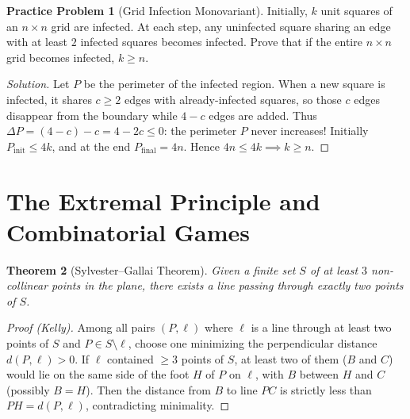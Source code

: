 \documentclass[11pt]{article}
\theoremstyle{plain}
\newtheorem{theorem}{Theorem}[section]
\theoremstyle{definition}
\newtheorem{problem}[theorem]{Practice Problem}
\newenvironment{solution}{\begin{proof}[Solution]}{\end{proof}}
\begin{document}
\begin{problem}[Grid Infection Monovariant]
Initially, $k$ unit squares of an $n \times n$ grid are infected. At each step, any uninfected square sharing an edge with at least $2$ infected squares becomes infected. Prove that if the entire $n \times n$ grid becomes infected, $k \ge n$.
\end{problem}
\begin{solution}
Let $P$ be the perimeter of the infected region. When a new square is infected, it shares $c \ge 2$ edges with already-infected squares, so those $c$ edges disappear from the boundary while $4-c$ edges are added. Thus $\Delta P = (4-c) - c = 4 - 2c \le 0$: the perimeter $P$ never increases! Initially $P_{\text{init}} \le 4k$, and at the end $P_{\text{final}} = 4n$. Hence $4n \le 4k \implies k \ge n$.
\end{solution}

\section{The Extremal Principle and Combinatorial Games}

\begin{theorem}[Sylvester--Gallai Theorem]
Given a finite set $S$ of at least $3$ non-collinear points in the plane, there exists a line passing through \emph{exactly two} points of $S$.
\end{theorem}
\begin{proof}[Proof (Kelly)]
Among all pairs $(P, \ell)$ where $\ell$ is a line through at least two points of $S$ and $P \in S \setminus \ell$, choose one minimizing the perpendicular distance $d(P, \ell) > 0$. If $\ell$ contained $\ge 3$ points of $S$, at least two of them ($B$ and $C$) would lie on the same side of the foot $H$ of $P$ on $\ell$, with $B$ between $H$ and $C$ (possibly $B=H$). Then the distance from $B$ to line $PC$ is strictly less than $PH = d(P, \ell)$, contradicting minimality.
\end{proof}
\end{document}
